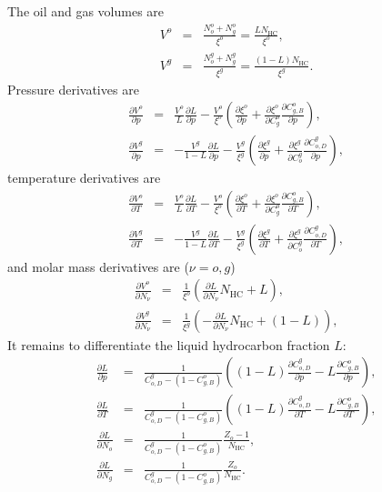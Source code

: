 The oil and gas volumes are
\begin{eqnarray}
  V^o & = & \frac{N_o^o + N_g^o}{\xi^o} =
  \frac{L N_\text{HC}}{\xi^o}, \\
  V^g & = & \frac{N_o^g + N_g^g}{\xi^g} =
  \frac{(1-L) N_\text{HC}}{\xi^g}.
\end{eqnarray}
Pressure derivatives are
\begin{eqnarray}
  \frac{\partial V^o}{\partial p} & = &
  \frac{V^o}{L} \frac{\partial L}{\partial p} -
  \frac{V^o}{\xi^o} \left(
    \frac{\partial \xi^o}{\partial p} +
    \frac{\partial \xi^o}{\partial C_g^o}
    \frac{\partial C_{g,B}^o}{\partial p}
  \right), \\
  \frac{\partial V^g}{\partial p} & = &
  -\frac{V^g}{1-L} \frac{\partial L}{\partial p} -
  \frac{V^g}{\xi^g} \left(
    \frac{\partial \xi^g}{\partial p} +
    \frac{\partial \xi^g}{\partial C_o^g}
    \frac{\partial C_{o,D}^g}{\partial p}
  \right),
\end{eqnarray}
temperature derivatives are
\begin{eqnarray}
  \frac{\partial V^o}{\partial T} & = &
  \frac{V^o}{L} \frac{\partial L}{\partial T} -
  \frac{V^o}{\xi^o} \left(
    \frac{\partial \xi^o}{\partial T} +
    \frac{\partial \xi^o}{\partial C_g^o}
    \frac{\partial C_{g,B}^o}{\partial T}
  \right), \\
  \frac{\partial V^g}{\partial T} & = &
  -\frac{V^g}{1-L} \frac{\partial L}{\partial T} -
  \frac{V^g}{\xi^g} \left(
    \frac{\partial \xi^g}{\partial T} +
    \frac{\partial \xi^g}{\partial C_o^g}
    \frac{\partial C_{o,D}^g}{\partial T}
  \right),
\end{eqnarray}
and molar mass derivatives are ($\nu=o,g$)
\begin{eqnarray}
  \frac{\partial V^o}{\partial N_\nu} & = &
  \frac{1}{\xi^o}\left(
    \frac{\partial L}{\partial N_\nu} N_\text{HC} +
    L \right), \\
  \frac{\partial V^g}{\partial N_\nu} & = &
  \frac{1}{\xi^g}\left(
    -\frac{\partial L}{\partial N_\nu} N_\text{HC} +
    (1-L) \right),
\end{eqnarray}
It remains to differentiate the liquid hydrocarbon fraction $L$:
\begin{eqnarray}
  \frac{\partial L}{\partial p} & = &
  \frac{1}{C_{o,D}^g - \left(1-C_{g,B}^o\right)}
  \left(
    (1-L) \frac{\partial C_{o,D}^g}{\partial p} -
    L \frac{\partial C_{g,B}^o}{\partial p}
  \right), \\
  \frac{\partial L}{\partial T} & = &
  \frac{1}{C_{o,D}^g - \left(1-C_{g,B}^o\right)}
  \left(
    (1-L) \frac{\partial C_{o,D}^g}{\partial T} -
    L \frac{\partial C_{g,B}^o}{\partial T}
  \right), \\
  \frac{\partial L}{\partial N_o} & = &
  \frac{1}{C_{o,D}^g - \left(1-C_{g,B}^o\right)}
  \frac{Z_o-1}{N_\text{HC}}, \\
  \frac{\partial L}{\partial N_g} & = &
  \frac{1}{C_{o,D}^g - \left(1-C_{g,B}^o\right)}
  \frac{Z_o}{N_\text{HC}}.
\end{eqnarray}


